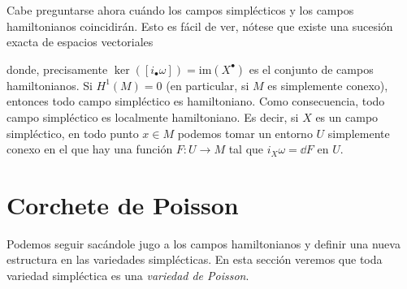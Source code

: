   Cabe preguntarse ahora cuándo los campos simplécticos y los campos hamiltonianos coincidirán. Esto es fácil de ver, nótese que existe una sucesión exacta de espacios vectoriales
  \begin{center}
  \end{center}
  donde, precisamente $\ker([i_{\bullet}\omega])=\mathrm{im}(X^{\bullet})$ es el conjunto de campos hamiltonianos.
  Si $H^1(M)=0$ (en particular, si $M$ es simplemente conexo), entonces todo campo simpléctico es hamiltoniano. Como consecuencia, todo campo simpléctico es localmente hamiltoniano. Es decir, si $X$ es un campo simpléctico, en todo punto $x\in M$ podemos tomar un entorno $U$ simplemente conexo en el que hay una función $F:U\rightarrow M$ tal que $i_X\omega=\dd F$ en $U$.

\section{Corchete de Poisson}\label{sec:poisson}
Podemos seguir sacándole jugo a los campos hamiltonianos y definir una nueva estructura en las variedades simplécticas. En esta sección veremos que toda variedad simpléctica es una \emph{variedad de Poisson}.

